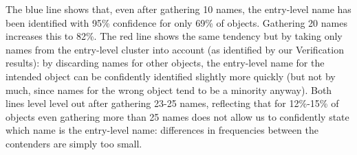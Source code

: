 The blue line shows that, even after gathering 10 names, the entry-level name has been identified with 95\% confidence for only 69\% of objects.
Gathering 20 names increases this to 82\%.
The red line shows the same tendency but by taking only names from the entry-level cluster into account (as identified by our Verification results):
by discarding names for other objects, the entry-level name for the intended object can be confidently identified slightly more quickly (but not by much, since names for the wrong object tend to be a minority anyway).
Both lines level level out after gathering 23-25 names, reflecting that for 12\%-15\% of objects even gathering more than 25 names does not allow us to confidently state which name is the entry-level name: differences in frequencies between the contenders are simply too small.


